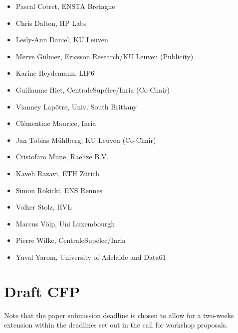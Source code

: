 \documentclass[a4paper,11pt]{article}
\begin{document}
\begin{itemize}
    \item Pascal Cotret, ENSTA Bretagne
    \item Chris Dalton, HP Labs
    \item{Lesly-Ann Daniel, KU Leuven}
    \item{Merve G\"ulmez, Ericsson Research/KU Leuven (Publicity)}
    \item Karine Heydemann, LIP6
    \item Guillaume Hiet, CentraleSupélec/Inria (Co-Chair)
    \item Vianney Lap\^otre, Univ. South Brittany
    \item{Cl\'ementine Maurice, Inria}
    \item Jan Tobias M\"uhlberg, KU Leuven (Co-Chair)
    \item Cristofaro Mune, Raelize B.V.
    \item Kaveh Razavi,  ETH Z\"urich 
    \item Simon Rokicki, ENS Rennes
    \item Volker Stolz, HVL
    \item{Marcus V\"olp, Uni Luxembourgh}
    \item Pierre Wilke, CentraleSup\'elec/Inria
    \item Yuval Yarom, University of Adelaide and Data61
\end{itemize}


\section{Draft CFP}
%
Note that the paper submission deadline is chosen to allow for a two-weeks
extension within the deadlines set out in the call for workshop proposals.
%

\end{document}
